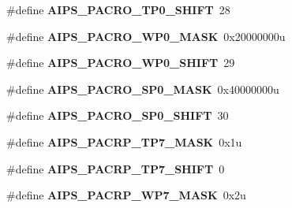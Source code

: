\begin{DoxyCompactItemize}
\item 
\#define {\bfseries A\+I\+P\+S\+\_\+\+P\+A\+C\+R\+O\+\_\+\+T\+P0\+\_\+\+S\+H\+I\+FT}~28\hypertarget{group__AIPS__Register__Masks_gadd58dae5c16f3b62ee7266eea13421ab}{}\label{group__AIPS__Register__Masks_gadd58dae5c16f3b62ee7266eea13421ab}

\item 
\#define {\bfseries A\+I\+P\+S\+\_\+\+P\+A\+C\+R\+O\+\_\+\+W\+P0\+\_\+\+M\+A\+SK}~0x20000000u\hypertarget{group__AIPS__Register__Masks_gaebfaa790eb3e309083d6accd3db7130f}{}\label{group__AIPS__Register__Masks_gaebfaa790eb3e309083d6accd3db7130f}

\item 
\#define {\bfseries A\+I\+P\+S\+\_\+\+P\+A\+C\+R\+O\+\_\+\+W\+P0\+\_\+\+S\+H\+I\+FT}~29\hypertarget{group__AIPS__Register__Masks_ga899da6b4930497e4f7c236c66ba5675e}{}\label{group__AIPS__Register__Masks_ga899da6b4930497e4f7c236c66ba5675e}

\item 
\#define {\bfseries A\+I\+P\+S\+\_\+\+P\+A\+C\+R\+O\+\_\+\+S\+P0\+\_\+\+M\+A\+SK}~0x40000000u\hypertarget{group__AIPS__Register__Masks_gae111c6dd6b157819d492adaad93d3808}{}\label{group__AIPS__Register__Masks_gae111c6dd6b157819d492adaad93d3808}

\item 
\#define {\bfseries A\+I\+P\+S\+\_\+\+P\+A\+C\+R\+O\+\_\+\+S\+P0\+\_\+\+S\+H\+I\+FT}~30\hypertarget{group__AIPS__Register__Masks_ga79d6c2d1da36742105657a59faba869d}{}\label{group__AIPS__Register__Masks_ga79d6c2d1da36742105657a59faba869d}

\item 
\#define {\bfseries A\+I\+P\+S\+\_\+\+P\+A\+C\+R\+P\+\_\+\+T\+P7\+\_\+\+M\+A\+SK}~0x1u\hypertarget{group__AIPS__Register__Masks_ga4de7c83f4b93cd32b27b9b6a6ce21b9e}{}\label{group__AIPS__Register__Masks_ga4de7c83f4b93cd32b27b9b6a6ce21b9e}

\item 
\#define {\bfseries A\+I\+P\+S\+\_\+\+P\+A\+C\+R\+P\+\_\+\+T\+P7\+\_\+\+S\+H\+I\+FT}~0\hypertarget{group__AIPS__Register__Masks_ga1c553dab75f6ee70910eb46864ce7ac8}{}\label{group__AIPS__Register__Masks_ga1c553dab75f6ee70910eb46864ce7ac8}

\item 
\#define {\bfseries A\+I\+P\+S\+\_\+\+P\+A\+C\+R\+P\+\_\+\+W\+P7\+\_\+\+M\+A\+SK}~0x2u\hypertarget{group__AIPS__Register__Masks_ga59ca0ed1637115a15dfa3974b9872dd6}{}\label{group__AIPS__Register__Masks_ga59ca0ed1637115a15dfa3974b9872dd6}


\end{DoxyCompactItemize}
